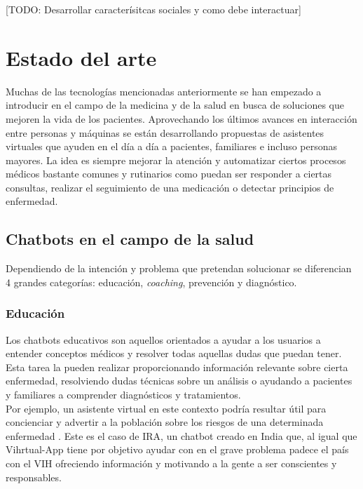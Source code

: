 [TODO: Desarrollar caracterísitcas sociales y como debe interactuar]


\section{Estado del arte}
Muchas de las tecnologías mencionadas anteriormente se han empezado a introducir en el campo de la medicina y de la salud en busca de soluciones que mejoren la vida de los pacientes. Aprovechando los últimos avances en interacción entre personas y máquinas  se están desarrollando propuestas de asistentes virtuales que ayuden en el día a día a pacientes, familiares e incluso personas mayores. La idea es siempre mejorar la atención y automatizar ciertos procesos médicos \cite{healthAgents} bastante comunes y rutinarios como puedan ser responder a ciertas consultas, realizar el seguimiento de una medicación o detectar principios de enfermedad. \\

\subsection{Chatbots en el campo de la salud}
Dependiendo de la intención y problema que pretendan solucionar se diferencian 4 grandes categorías: educación, \textit{coaching}, prevención y diagnóstico.\\

\subsubsection{Educación}
Los chatbots educativos son aquellos orientados a ayudar a los usuarios a entender conceptos médicos y resolver todas aquellas dudas que puedan tener. Esta tarea la pueden realizar proporcionando información relevante sobre cierta enfermedad, resolviendo dudas técnicas sobre un análisis o ayudando a pacientes y familiares a comprender diagnósticos y tratamientos. \\

Por ejemplo, un asistente virtual en este contexto podría resultar útil para  concienciar y advertir a la población sobre los riesgos de una determinada enfermedad . Este es el caso de IRA, un chatbot creado en India que, al igual que Vihrtual-App tiene por objetivo ayudar con en el grave problema padece el país con el VIH ofreciendo información y motivando a la gente a ser conscientes y responsables.\\

